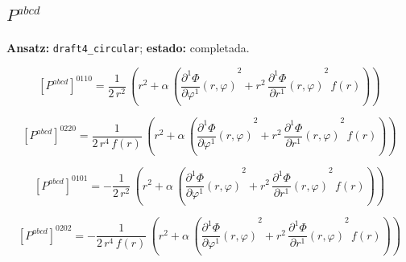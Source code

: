 \documentclass[11pt]{article}
\begin{document}
\subsection*{$ P^{abcd} $}
\textbf{Ansatz:} \texttt{draft4\_circular}; \textbf{estado:} completada.\par
\begin{dmath*}[breakdepth={5}]
\left[P^{abcd}\right]^{0110} = \frac{1}{2\,{r}^{2}}\,\left({r}^{2} + \alpha\,\left({\frac{\partial^{1} \Phi}{\partial \varphi^{1}}\!\left(r, \varphi\right)}^{2} + {r}^{2}\,{\frac{\partial^{1} \Phi}{\partial r^{1}}\!\left(r, \varphi\right)}^{2}\,f\!\left(r\right)\right)\right)
\end{dmath*}
\par\smallskip
\begin{dmath*}[breakdepth={5}]
\left[P^{abcd}\right]^{0220} = \frac{1}{2\,{r}^{4}\,f\!\left(r\right)}\,\left({r}^{2} + \alpha\,\left({\frac{\partial^{1} \Phi}{\partial \varphi^{1}}\!\left(r, \varphi\right)}^{2} + {r}^{2}\,{\frac{\partial^{1} \Phi}{\partial r^{1}}\!\left(r, \varphi\right)}^{2}\,f\!\left(r\right)\right)\right)
\end{dmath*}
\par\smallskip
\begin{dmath*}[breakdepth={5}]
\left[P^{abcd}\right]^{0101} = -\frac{1}{2\,{r}^{2}}\,\left({r}^{2} + \alpha\,\left({\frac{\partial^{1} \Phi}{\partial \varphi^{1}}\!\left(r, \varphi\right)}^{2} + {r}^{2}\,{\frac{\partial^{1} \Phi}{\partial r^{1}}\!\left(r, \varphi\right)}^{2}\,f\!\left(r\right)\right)\right)
\end{dmath*}
\par\smallskip
\begin{dmath*}[breakdepth={5}]
\left[P^{abcd}\right]^{0202} = -\frac{1}{2\,{r}^{4}\,f\!\left(r\right)}\,\left({r}^{2} + \alpha\,\left({\frac{\partial^{1} \Phi}{\partial \varphi^{1}}\!\left(r, \varphi\right)}^{2} + {r}^{2}\,{\frac{\partial^{1} \Phi}{\partial r^{1}}\!\left(r, \varphi\right)}^{2}\,f\!\left(r\right)\right)\right)
\end{dmath*}
\end{document}

